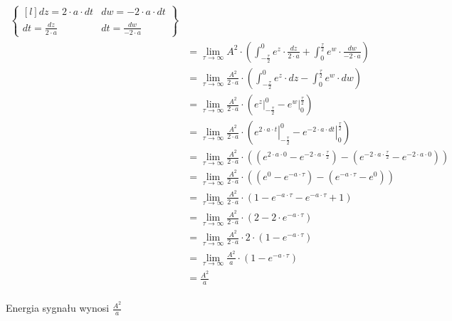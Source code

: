 \begin{task}
\begin{align*}
\begin{Bmatrix*}[l]
   dz = 2 \cdot a \cdot dt & dw=-2 \cdot a \cdot dt\\
   dt = \frac{dz}{2\cdot a} & dt = \frac{dw}{-2 \cdot a}
   \end{Bmatrix*}\\
 &=\lim_{\tau \rightarrow \infty} A^2 \cdot \left( 
    \int_{-\frac{\tau}{2}}^{0}  e^{z} \cdot \frac{dz}{2\cdot a} 
 +  \int_{0}^{\frac{\tau}{2}} e^{w} \cdot \frac{dw}{-2\cdot a} \right)\\
 &=\lim_{\tau \rightarrow \infty} \frac{A^2}{2\cdot a} \cdot \left( 
    \int_{-\frac{\tau}{2}}^{0}  e^{z} \cdot dz 
 -  \int_{0}^{\frac{\tau}{2}} e^{w} \cdot dw \right)\\
 &=\lim_{\tau \rightarrow \infty} \frac{A^2}{2\cdot a} \cdot \left( 
    \left. e^{z} \right|_{-\frac{\tau}{2}}^{0} 
 -  \left. e^{w} \right|_{0}^{\frac{\tau}{2}} \right)\\ 
 &=\lim_{\tau \rightarrow \infty} \frac{A^2}{2\cdot a} \cdot \left( 
    \left. e^{2\cdot a \cdot t} \right|_{-\frac{\tau}{2}}^{0} 
 -  \left. e^{-2 \cdot a \cdot dt} \right|_{0}^{\frac{\tau}{2}} \right)\\ 
 &=\lim_{\tau \rightarrow \infty} \frac{A^2}{2\cdot a} \cdot \left( 
    \left(e^{2\cdot a \cdot 0} -e^{-2\cdot a \cdot \frac{\tau}{2}} \right)
 -  \left(e^{-2 \cdot a \cdot \frac{\tau}{2}}-e^{-2 \cdot a \cdot 0} \right) \right)\\ 
 &=\lim_{\tau \rightarrow \infty} \frac{A^2}{2\cdot a} \cdot \left( 
    \left(e^{0} -e^{-a \cdot \tau} \right)
 -  \left(e^{-a \cdot \tau}-e^{0} \right)\right)\\
 &=\lim_{\tau \rightarrow \infty} \frac{A^2}{2\cdot a} \cdot \left( 
    1 -e^{-a \cdot \tau} -  e^{-a \cdot \tau}+1 \right)\\
 &=\lim_{\tau \rightarrow \infty} \frac{A^2}{2\cdot a} \cdot \left( 
    2 - 2\cdot e^{-a \cdot \tau} \right)\\
 &=\lim_{\tau \rightarrow \infty} \frac{A^2}{2\cdot a} \cdot 2 \cdot \left( 
    1 - e^{-a \cdot \tau} \right)\\
 &=\lim_{\tau \rightarrow \infty} \frac{A^2}{a} \cdot \left( 
 1 - e^{-a \cdot \tau} \right)\\
 &= \frac{A^2}{a}\\
\end{align*}

Energia sygnału wynosi $\frac{A^2}{a}$
\end{task}
